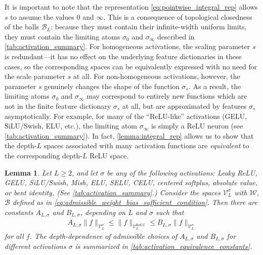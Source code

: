 \documentclass{article}
\DeclareMathOperator{\ReLU}{\mathrm{ReLU}}
\def\cB{{\mathcal{B}}}
\def\cV{{\mathcal{V}}}
\def\cW{{\mathcal{W}}}
\newtheorem{lemma}[theorem]{Lemma}
\begin{document}
It is important to note that the representation \eqref{eq:pointwise_integral_rep} allows $s$ to assume the values 0 and $\infty$. This is a consequence of topological closedness of the balls $\cB_L$: because they must contain their infinite-width uniform limits, they must contain the limiting atoms $\sigma_0$ and $\sigma_\infty$ described in \cref{tab:activation_summary}. For homogeneous activations, the scaling parameter $s$ is redundant---it has no effect on the underlying feature dictionaries in these cases, so the corresponding spaces can be equivalently expressed with no need for the scale parameter $s$ at all. For non-homogeneous activations, however, the parameter $s$ genuinely changes the shape of the function $\sigma_s$. As a result, the limiting atoms $\sigma_0$ and $\sigma_\infty$ may correspond to entirely new functions which are not in the finite feature dictionary $\sigma_s$ at all, but are approximated by features $\sigma_s$ asymptotically. For example, for many of the ``ReLU-like'' activations (GELU, SiLU/Swish, ELU, etc.), the limiting atom $\sigma_\infty$ is simply a ReLU neuron (see \cref{tab:activation_summary}). In fact, \cref{lemma:integral_rep} allows us to show that the depth-$L$ spaces associated with many activation functions are \textit{equivalent} to the corresponding depth-$L$ ReLU space. 
\begin{lemma} \label{lemma:relu_nonrelu_space_equivalence}
    Let $L \geq 2$, and let $\sigma$ be any of the following activations: Leaky ReLU,  GELU, SiLU/Swish, Mish, ELU, SELU, CELU, centered softplus, absolute value, or bent identity. (See \cref{tab:activation_summary}.) Consider the spaces $\cV_L^\sigma$ with $\cW$, $\cB$ defined as in \eqref{eq:admissible_weight_bias_sufficient_condition}. Then there are constants $A_{L,\sigma}$ and $B_{L,\sigma}$, depending on $L$ and $\sigma$ such that
    \begin{align}
        A_{L,\sigma} \| f \|_{\cV_L^{\sigma}} \leq \| f \|_{\cV_L^{\ReLU}} \leq B_{L,\sigma} \| f \|_{\cV_L^{\sigma}} 
    \end{align}
    for all $f$. The depth-dependence of admissible choices of $A_{L,\sigma}$ and $B_{L,\sigma}$ for different activations $\sigma$ is summarized in \cref{tab:activation_equivalence_constants}.
\end{lemma}
\end{document}
